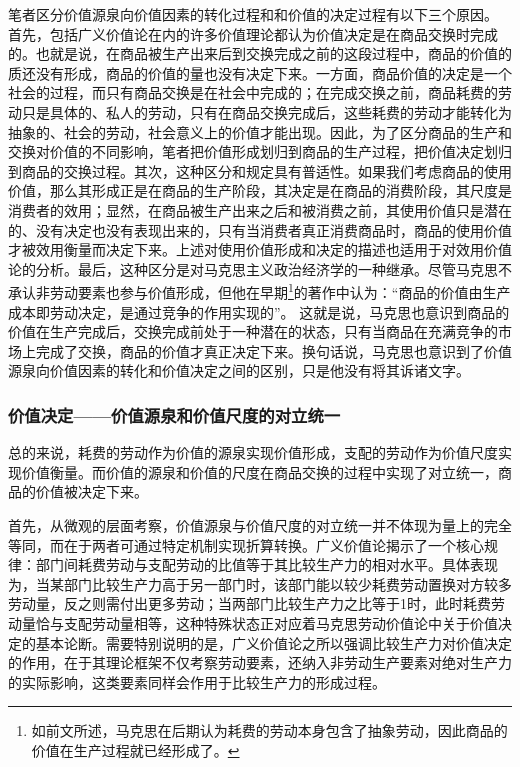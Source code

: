 笔者区分价值源泉向价值因素的转化过程和和价值的决定过程有以下三个原因。 首先，包括广义价值论在内的许多价值理论都认为价值决定是在商品交换时完成的。也就是说，在商品被生产出来后到交换完成之前的这段过程中，商品的价值的质还没有形成，商品的价值的量也没有决定下来。一方面，商品价值的决定是一个社会的过程，而只有商品交换是在社会中完成的；在完成交换之前，商品耗费的劳动只是具体的、私人的劳动，只有在商品交换完成后，这些耗费的劳动才能转化为抽象的、社会的劳动，社会意义上的价值才能出现。因此，为了区分商品的生产和交换对价值的不同影响，笔者把价值形成划归到商品的生产过程，把价值决定划归到商品的交换过程。其次，这种区分和规定具有普适性。如果我们考虑商品的使用价值，那么其形成正是在商品的生产阶段，其决定是在商品的消费阶段，其尺度是消费者的效用；显然，在商品被生产出来之后和被消费之前，其使用价值只是潜在的、没有决定也没有表现出来的，只有当消费者真正消费商品时，商品的使用价值才被效用衡量而决定下来。上述对使用价值形成和决定的描述也适用于对效用价值论的分析。最后，这种区分是对马克思主义政治经济学的一种继承。尽管马克思不承认非劳动要素也参与价值形成，但他在早期\footnote{如前文所述，马克思在后期认为耗费的劳动本身包含了抽象劳动，因此商品的价值在生产过程就已经形成了。}的著作中认为：“商品的价值由生产成本即劳动决定，是通过竞争的作用实现的”\cite[3]{ZhangLeiShengMaKeSiLaoDongJieZhiLunYanJiuDeLiShiZhengTiXing2015}。 这就是说，马克思也意识到商品的价值在生产完成后，交换完成前处于一种潜在的状态，只有当商品在充满竞争的市场上完成了交换，商品的价值才真正决定下来。换句话说，马克思也意识到了价值源泉向价值因素的转化和价值决定之间的区别，只是他没有将其诉诸文字。

\subsubsection{价值决定——价值源泉和价值尺度的对立统一}

总的来说，耗费的劳动作为价值的源泉实现价值形成，支配的劳动作为价值尺度实现价值衡量。而价值的源泉和价值的尺度在商品交换的过程中实现了对立统一，商品的价值被决定下来。

首先，从微观的层面考察，价值源泉与价值尺度的对立统一并不体现为量上的完全等同，而在于两者可通过特定机制实现折算转换。广义价值论揭示了一个核心规律：部门间耗费劳动与支配劳动的比值等于其比较生产力的相对水平。具体表现为，当某部门比较生产力高于另一部门时，该部门能以较少耗费劳动置换对方较多劳动量，反之则需付出更多劳动；当两部门比较生产力之比等于1时，此时耗费劳动量恰与支配劳动量相等，这种特殊状态正对应着马克思劳动价值论中关于价值决定的基本论断。需要特别说明的是，广义价值论之所以强调比较生产力对价值决定的作用，在于其理论框架不仅考察劳动要素，还纳入非劳动生产要素对绝对生产力的实际影响，这类要素同样会作用于比较生产力的形成过程。

